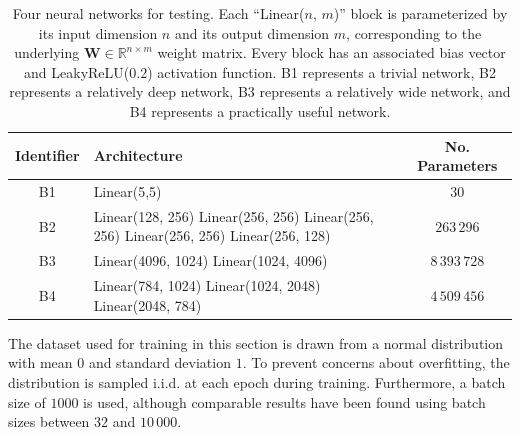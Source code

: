 \documentclass{article}
\theoremstyle{plain}
\theoremstyle{definition}
\theoremstyle{remark}
\newcommand{\vW}{\mathbf{W}}
\begin{document}
\begin{table}[htbp]
    \begin{center}
        \begin{tabular}{|c|p{}|c|}
            \hline
            \textbf{Identifier} & \textbf{Architecture}                                                                                                    & \textbf{No. Parameters} \\
            \hline
            \hline
            B1                  & Linear(5,5)                                                                                                              & $30$                    \\
            \hline
            B2                  & Linear(128, 256) \newline Linear(256, 256) \newline Linear(256, 256) \newline Linear(256, 256) \newline Linear(256, 128) & $263\,296$              \\
            \hline
            B3                  & Linear(4096, 1024) \newline Linear(1024, 4096)                                                                           & $8\,393\,728$           \\
            \hline
            B4                  & Linear(784, 1024) \newline Linear(1024, 2048) \newline Linear(2048, 784)                                                 & $4\,509\,456$           \\
            \hline
        \end{tabular}
        \vspace{5pt}
        \caption{Four neural networks for testing. Each ``Linear($n$, $m$)'' block is parameterized by its input dimension $n$ and its output dimension $m$, corresponding to the underlying $\vW \in \mathbb{R}^{n \times m}$ weight matrix. Every block has an associated bias vector and LeakyReLU($0.2$) activation function. B1 represents a trivial network, B2 represents a relatively deep network, B3 represents a relatively wide network, and B4 represents a practically useful network.}
        \label{tab:networks}
    \end{center}
\end{table}

The dataset used for training in this section is drawn from a normal distribution with mean $0$ and standard deviation $1$. To prevent concerns about overfitting, the distribution is sampled i.i.d. at each epoch during training. Furthermore, a batch size of $1000$ is used, although comparable results have been found using batch sizes between $32$ and $10\,000$.
\end{document}
